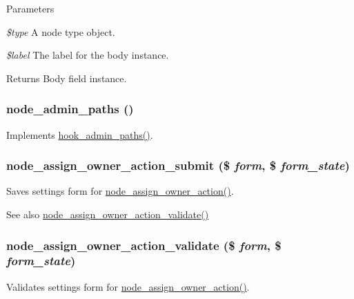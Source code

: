 \begin{DoxyParams}{Parameters}
\item[{\em \$type}]A node type object. \item[{\em \$label}]The label for the body instance.\end{DoxyParams}
\begin{DoxyReturn}{Returns}
Body field instance. 
\end{DoxyReturn}
\hypertarget{node_8module_ab741d57a109d08dee6ac1a13137038ea}{
\subsubsection[{node\_\-admin\_\-paths}]{\setlength{\rightskip}{0pt plus 5cm}node\_\-admin\_\-paths ()}}
\label{node_8module_ab741d57a109d08dee6ac1a13137038ea}
Implements \hyperlink{group__hooks_ga3fe6d93afc8bb04afbd9e3c326d1bdc1}{hook\_\-admin\_\-paths()}. \hypertarget{node_8module_a777bb331cf28f580e2a3030d95d9f254}{
\subsubsection[{node\_\-assign\_\-owner\_\-action\_\-submit}]{\setlength{\rightskip}{0pt plus 5cm}node\_\-assign\_\-owner\_\-action\_\-submit (\$ {\em form}, \/  \$ {\em form\_\-state})}}
\label{node_8module_a777bb331cf28f580e2a3030d95d9f254}
Saves settings form for \hyperlink{group__actions_ga35a1ee4e6845f1031ef84ef787252efd}{node\_\-assign\_\-owner\_\-action()}.

\begin{DoxySeeAlso}{See also}
\hyperlink{node_8module_a85a0ccfdb35dae02fed98ec3c3498c85}{node\_\-assign\_\-owner\_\-action\_\-validate()} 
\end{DoxySeeAlso}
\hypertarget{node_8module_a85a0ccfdb35dae02fed98ec3c3498c85}{
\subsubsection[{node\_\-assign\_\-owner\_\-action\_\-validate}]{\setlength{\rightskip}{0pt plus 5cm}node\_\-assign\_\-owner\_\-action\_\-validate (\$ {\em form}, \/  \$ {\em form\_\-state})}}
\label{node_8module_a85a0ccfdb35dae02fed98ec3c3498c85}
Validates settings form for \hyperlink{group__actions_ga35a1ee4e6845f1031ef84ef787252efd}{node\_\-assign\_\-owner\_\-action()}.

